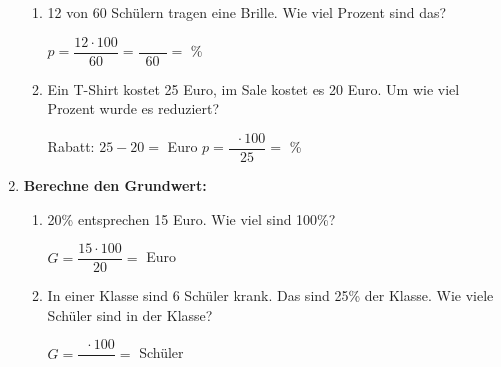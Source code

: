 \begin{enumerate}[label=\arabic*., resume]
    \vspace{0.5cm}

    \begin{enumerate}[label=\alph*)]
        \item 12 von 60 Schülern tragen eine Brille. Wie viel Prozent sind das?

        \vspace{0.3cm}
        $p = \dfrac{12 \cdot 100}{60} = \dfrac{\phantom{0000}}{60} = $ \underline{\hspace{2cm}} \%

        \vspace{0.5cm}

        \item Ein T-Shirt kostet 25 Euro, im Sale kostet es 20 Euro. Um wie viel Prozent wurde es reduziert?

        \vspace{0.3cm}
        Rabatt: $25 - 20 = $ \underline{\hspace{2cm}} Euro
        \vspace{0.3cm}
        $p = \dfrac{\phantom{0} \cdot 100}{25} = $ \underline{\hspace{2cm}} \%

    \end{enumerate}

    \vspace{1cm}

    \item \textbf{Berechne den Grundwert:}

    \vspace{0.5cm}

    \begin{enumerate}[label=\alph*)]
        \item 20\% entsprechen 15 Euro. Wie viel sind 100\%?

        \vspace{0.3cm}
        $G = \dfrac{15 \cdot 100}{20} = $ \underline{\hspace{2cm}} Euro

        \vspace{0.5cm}

        \item In einer Klasse sind 6 Schüler krank. Das sind 25\% der Klasse. Wie viele Schüler sind in der Klasse?

        \vspace{0.3cm}
        $G = \dfrac{\phantom{0} \cdot 100}{\phantom{00}} = $ \underline{\hspace{2cm}} Schüler


\end{enumerate}
\end{enumerate}
